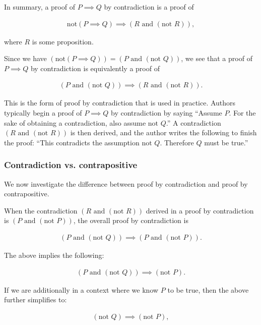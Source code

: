 In summary, a proof of $P \implies Q$ by contradiction is a proof of

\begin{align*}
    \text{not}(P \implies Q) \implies (R \text{ and } (\text{not } R)),
\end{align*}

where $R$ is some proposition.

Since we have $(\text{not}(P \implies Q)) = (P \text{ and } (\text{not } Q))$, we see that a proof of $P \implies Q$ by contradiction is equivalently a proof of

\begin{align*}
    (P \text{ and } (\text{not } Q)) \implies (R \text{ and } (\text{not } R)).
\end{align*}

This is the form of proof by contradiction that is used in practice. Authors typically begin a proof of $P \implies Q$ by contradiction by saying ``Assume $P$. For the sake of obtaining a contradiction, also assume $\text{not } Q$.'' A contradiction $(R \text{ and } (\text{not } R))$ is then derived, and the author writes the following to finish the proof: ``This contradicts the assumption $\text{not } Q$. Therefore $Q$ must be true.'' 

\subsubsection*{Contradiction vs. contrapositive}

We now investigate the difference between proof by contradiction and proof by contrapositive. 

When the contradiction $(R \text{ and } (\text{not } R))$ derived in a proof by contradiction is $(P \text{ and } (\text{not } P))$, the overall proof by contradiction is

\begin{align*}
    (P \text{ and } (\text{not } Q)) \implies (P \text{ and } (\text{not } P)).
\end{align*}

The above implies the following:

\begin{align*}
    (P \text{ and } (\text{not } Q)) \implies (\text{not } P).
\end{align*}

If we are additionally in a context where we know $P$ to be true, then the above further simplifies to:

\begin{align*}
    (\text{not } Q) \implies (\text{not } P),
\end{align*}

